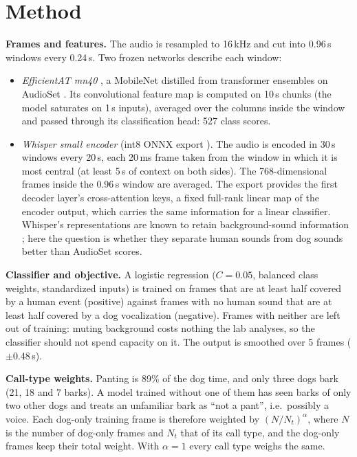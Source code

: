 \documentclass[10pt,twocolumn,a4paper]{article}
\begin{document}
\section{Method}
\label{sec:method}
\textbf{Frames and features.} The audio is resampled to 16\,kHz and cut into 0.96\,s windows every
0.24\,s. Two frozen networks describe each window:
\begin{itemize}\setlength\itemsep{0pt}
\item \emph{EfficientAT mn40} \cite{schmid2023efficientat}, a MobileNet distilled from transformer
ensembles on AudioSet \cite{gemmeke2017audioset}. Its convolutional feature map is computed on 10\,s
chunks (the model saturates on 1\,s inputs), averaged over the columns inside the window and passed
through its classification head: 527 class scores.
\item \emph{Whisper small encoder} \cite{radford2023whisper} (int8 ONNX export \cite{sherpaonnx}).
The audio is encoded in 30\,s windows every 20\,s, each 20\,ms frame taken from the window in which it
is most central (at least 5\,s of context on both sides). The 768-dimensional frames inside the 0.96\,s
window are averaged. The export provides the first decoder layer's cross-attention keys, a fixed
full-rank linear map of the encoder output, which carries the same information for a linear classifier.
Whisper's representations are known to retain background-sound information \cite{gong2023whisperat};
here the question is whether they separate human sounds from dog sounds better than AudioSet scores.
\end{itemize}

\textbf{Classifier and objective.} A logistic regression ($C=0.05$, balanced class weights, standardized
inputs) is trained on frames that are at least half covered by a human event (positive) against frames
with no human sound that are at least half covered by a dog vocalization (negative). Frames with neither
are left out of training: muting background costs nothing the lab analyses, so the classifier should not
spend capacity on it. The output is smoothed over 5 frames ($\pm$0.48\,s).

\textbf{Call-type weights.} Panting is 89\% of the dog time, and only three dogs bark (21, 18 and 7
barks). A model trained without one of them has seen barks of only two other dogs and treats an unfamiliar
bark as ``not a pant'', i.e.\ possibly a voice. Each dog-only training frame is therefore weighted by
$(N/N_t)^{\alpha}$, where $N$ is the number of dog-only frames and $N_t$ that of its call type, and the
dog-only frames keep their total weight. With $\alpha=1$ every call type weighs the same.
\end{document}

